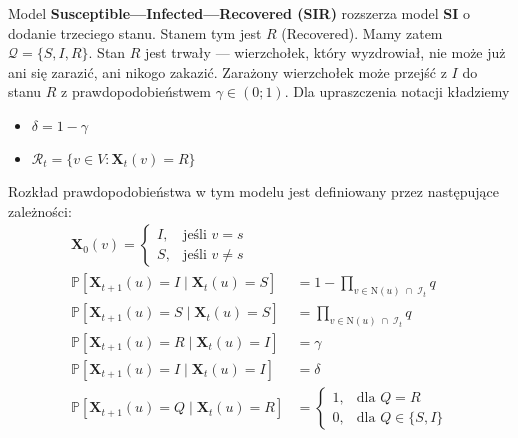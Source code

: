 Model \textbf{Susceptible—Infected—Recovered (SIR)} rozszerza model \textbf{SI} o dodanie trzeciego stanu. Stanem tym jest $R$ (Recovered). Mamy zatem $\mathcal{Q} = \{S, I, R\}$.
Stan $R$ jest trwały — wierzchołek, który wyzdrowiał, nie może już ani się zarazić, ani nikogo zakazić. Zarażony wierzchołek może przejść z $I$ do stanu $R$ z prawdopodobieństwem $\gamma \in (0;1)$. Dla upraszczenia notacji kładziemy 
\begin{itemize}
    \item $\delta=1-\gamma$
    \item $\mathcal{R}_t=\{v\in V: \mathbf{X}_t(v) = R\}$
\end{itemize}
Rozkład prawdopodobieństwa w tym modelu jest definiowany przez następujące zależności:
\[
\begin{aligned}
\mathbf{X}_0(v) =
\begin{cases}
I, & \text{jeśli } v = s \\[4pt]
S, & \text{jeśli } v \neq s
\end{cases} \\
\mathbb{P}[\mathbf{X}_{t+1}(u) = I \mid \mathbf{X}_t(u) = S]
 &= 1 - \prod_{v \in \mathrm{N}(u) \;\cap\; \mathcal{I}_t} q \\[6pt]
\mathbb{P}[\mathbf{X}_{t+1}(u) = S \mid \mathbf{X}_t(u) = S]
 &= \prod_{v \in \mathrm{N}(u) \;\cap\; \mathcal{I}_t} q \\[6pt]
\mathbb{P}[\mathbf{X}_{t+1}(u) = R \mid \mathbf{X}_t(u) = I]
 &= \gamma \\[6pt]
\mathbb{P}[\mathbf{X}_{t+1}(u) = I \mid \mathbf{X}_t(u) = I]
 &= \delta \\[6pt]
\mathbb{P}[\mathbf{X}_{t+1}(u) = Q \mid \mathbf{X}_t(u) = R]
 &= 
\begin{cases}
1, & \text{dla } Q = R \\[4pt]
0, & \text{dla } Q \in \{S, I\}
\end{cases}
\end{aligned}
\]

